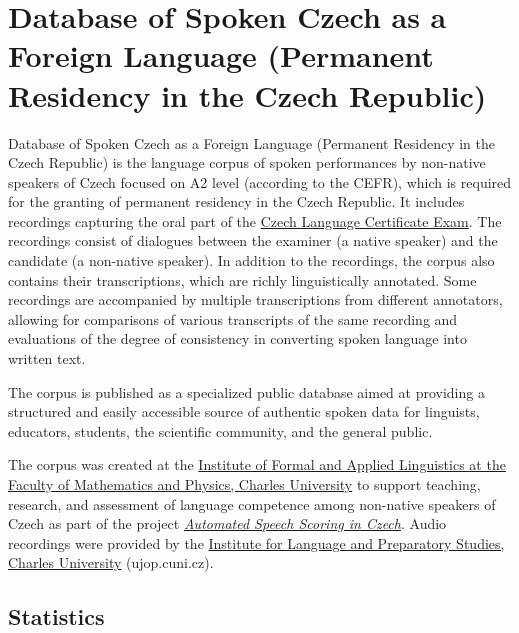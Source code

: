 \documentclass[
]{article}
\author{}
\date{}
\begin{document}
\hypertarget{database-of-spoken-czech-as-a-foreign-language-permanent-residency-in-the-czech-republic}{%
\section{Database of Spoken Czech as a Foreign Language (Permanent
Residency in the Czech
Republic)}\label{database-of-spoken-czech-as-a-foreign-language-permanent-residency-in-the-czech-republic}}

Database of Spoken Czech as a Foreign Language (Permanent Residency in
the Czech Republic) is the language corpus of spoken performances by
non-native speakers of Czech focused on A2 level (according to the
CEFR), which is required for the granting of permanent residency in the
Czech Republic. It includes recordings capturing the oral part of the
\href{https://ujop.cuni.cz/UJOPEN-70.html?ujopcmsid=12:czech-language-certificate-exam-cce}{Czech
Language Certificate Exam}. The recordings consist of dialogues between
the examiner (a native speaker) and the candidate (a non-native
speaker). In addition to the recordings, the corpus also contains their
transcriptions, which are richly linguistically annotated. Some
recordings are accompanied by multiple transcriptions from different
annotators, allowing for comparisons of various transcripts of the same
recording and evaluations of the degree of consistency in converting
spoken language into written text.

The corpus is published as a specialized public database aimed at
providing a structured and easily accessible source of authentic spoken
data for linguists, educators, students, the scientific community, and
the general public.

The corpus was created at the \href{https://ufal.mff.cuni.cz/}{Institute
of Formal and Applied Linguistics at the Faculty of Mathematics and
Physics, Charles University} to support teaching, research, and
assessment of language competence among non-native speakers of Czech as
part of the project
\href{https://ufal.mff.cuni.cz/automated-speech-scoring-czech}{\emph{Automated
Speech Scoring in Czech}}. Audio recordings were provided by the
\href{https://ujop.cuni.cz/UJOPEN-1.html}{Institute for Language and
Preparatory Studies, Charles University} (ujop.cuni.cz).

\hypertarget{statistics}{%
\subsection{Statistics}\label{statistics}}
\end{document}
